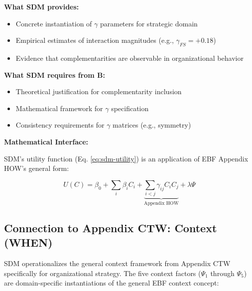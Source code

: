 \begin{tcolorbox}[colback=yellow!5!white, colframe=yellow!75!black,
    title=Integration: SDM $\leftrightarrow$ Appendix HOW (HOW)]

\textbf{What SDM provides:}
\begin{itemize}[nosep]
\item Concrete instantiation of $\gamma$ parameters for strategic domain
\item Empirical estimates of interaction magnitudes (e.g., $\gamma_{FS} = +0.18$)
\item Evidence that complementarities are observable in organizational behavior
\end{itemize}

\textbf{What SDM requires from B:}
\begin{itemize}[nosep]
\item Theoretical justification for complementarity inclusion
\item Mathematical framework for $\gamma$ specification
\item Consistency requirements for $\gamma$ matrices (e.g., symmetry)
\end{itemize}

\textbf{Mathematical Interface:}

SDM's utility function (Eq. \ref{eq:sdm-utility}) is an application of EBF Appendix HOW's general form:

\begin{equation}
U(C) = \beta_0 + \sum_i \beta_i C_i + \underbrace{\sum_{i<j} \gamma_{ij} C_i C_j}_{\text{Appendix HOW}} + \lambda \Psi
\end{equation}

\end{tcolorbox}

\subsection{Connection to Appendix CTW: Context (WHEN)}

SDM operationalizes the general context framework from Appendix CTW specifically for organizational strategy. The five context factors ($\Psi_1$ through $\Psi_5$) are domain-specific instantiations of the general EBF context concept:

